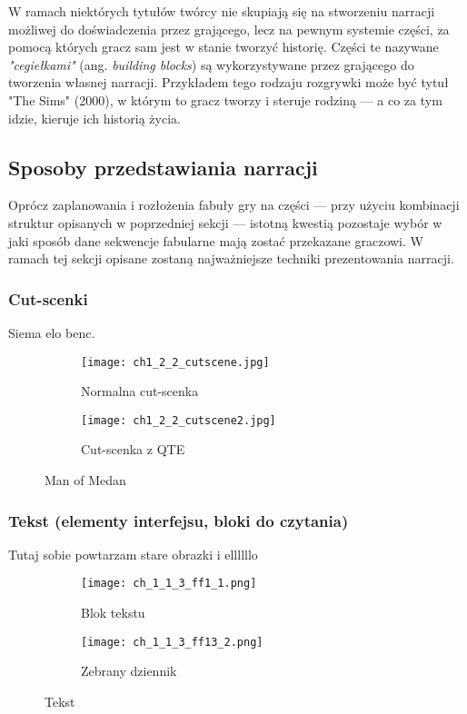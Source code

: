 W ramach niektórych tytułów twórcy nie skupiają się na stworzeniu narracji możliwej do doświadczenia
przez grającego, lecz na pewnym systemie części, za pomocą których gracz sam jest w stanie tworzyć
historię. Części te nazywane \textit{"cegiełkami"} (ang. \textit{building blocks})\cite{theorising_narrative}
są wykorzystywane przez grającego do tworzenia własnej narracji. Przykładem tego rodzaju rozgrywki
może być tytuł "The Sims" (2000), w którym to gracz tworzy i steruje rodziną --- a co za tym idzie,
kieruje ich historią życia.

\subsection{Sposoby przedstawiania narracji}\label{subsection:ch1_2_2}

Oprócz zaplanowania i rozłożenia fabuły gry na części --- przy użyciu kombinacji struktur opisanych
w poprzedniej sekcji --- istotną kwestią pozostaje wybór w jaki sposób dane sekwencje fabularne
mają zostać przekazane graczowi. W ramach tej sekcji opisane zostaną najważniejsze techniki
prezentowania narracji.

\subsubsection*{Cut-scenki}

Siema elo benc.

\begin{figure}[h]
	\begin{subfigure}{0.49\textwidth}
		\caption{Normalna cut-scenka}
		\texttt{[image: ch1\_2\_2\_cutscene.jpg]}
		\label{subfig:ch_1_2_2_cutscene1}
	\end{subfigure}
	\begin{subfigure}{0.49\textwidth}
		\caption{Cut-scenka z QTE}
		\texttt{[image: ch1\_2\_2\_cutscene2.jpg]}
		\label{subfig:ch_1_2_2_cutscene2}
	\end{subfigure}
	\caption{Man of Medan}
	\label{fig:ch1_2_2_cutscene}
\end{figure}

\subsubsection*{Tekst (elementy interfejsu, bloki do czytania)}

Tutaj sobie powtarzam stare obrazki i ellllllo

\begin{figure}[h]
	\begin{subfigure}{0.49\textwidth}
		\caption{Blok tekstu}
		\texttt{[image: ch\_1\_1\_3\_ff1\_1.png]}
		\label{subfig:ch_1_2_2_text1}
	\end{subfigure}
	\begin{subfigure}{0.49\textwidth}
		\caption{Zebrany dziennik}
		\texttt{[image: ch\_1\_1\_3\_ff13\_2.png]}
		\label{subfig:ch_1_2_2_text2}
	\end{subfigure}
	\caption{Tekst}
	\label{fig:ch1_2_2_text}
\end{figure}


